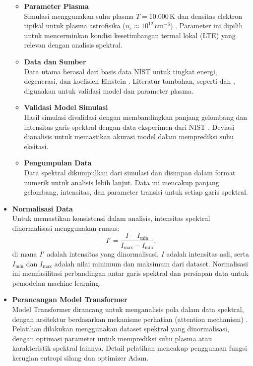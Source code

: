 \begin{itemize}
\begin{itemize}
            \item \textbf{Parameter Plasma} \\
                  Simulasi menggunakan suhu plasma \( T = 10.000 \, \text{K} \) dan densitas elektron tipikal untuk plasma astrofisika (\( n_e \approx 10^{12} \, \text{cm}^{-3} \)) \citep{Draine2011}. Parameter ini dipilih untuk mencerminkan kondisi kesetimbangan termal lokal (LTE) yang relevan dengan analisis spektral.

            \item \textbf{Data dan Sumber} \\
                  Data utama berasal dari basis data NIST untuk tingkat energi, degenerasi, dan koefisien Einstein \citep{NIST2025}. Literatur tambahan, seperti \citet{rybicki-1985} dan \citet{Draine2011}, digunakan untuk validasi model dan parameter plasma.

            \item \textbf{Validasi Model Simulasi} \\
                  Hasil simulasi divalidasi dengan membandingkan panjang gelombang dan intensitas garis spektral dengan data eksperimen dari NIST \citep{NIST2025}. Deviasi dianalisis untuk memastikan akurasi model dalam memprediksi suhu eksitasi.

            \item \textbf{Pengumpulan Data} \\
                  Data spektral dikumpulkan dari simulasi dan disimpan dalam format numerik untuk analisis lebih lanjut. Data ini mencakup panjang gelombang, intensitas, dan parameter transisi untuk setiap garis spektral.
        \end{itemize}

    \item \textbf{Normalisasi Data} \\
          Untuk memastikan konsistensi dalam analisis, intensitas spektral dinormalisasi menggunakan rumus:
          \begin{equation}
              I' = \frac{I - I_{\min}}{I_{\max} - I_{\min}}, \label{eq:normalization}
          \end{equation}
          di mana \( I' \) adalah intensitas yang dinormalisasi, \( I \) adalah intensitas asli, serta \( I_{\min} \) dan \( I_{\max} \) adalah nilai minimum dan maksimum dari dataset. Normalisasi ini memfasilitasi perbandingan antar garis spektral dan persiapan data untuk pemodelan machine learning.

    \item \textbf{Perancangan Model Transformer} \\
          Model Transformer dirancang untuk menganalisis pola dalam data spektral, dengan arsitektur berdasarkan mekanisme perhatian (attention mechanism) \citep{Vaswani2017}. Pelatihan dilakukan menggunakan dataset spektral yang dinormalisasi, dengan optimasi parameter untuk memprediksi suhu plasma atau karakteristik spektral lainnya. Detail pelatihan mencakup penggunaan fungsi kerugian entropi silang dan optimizer Adam.


\end{itemize}
